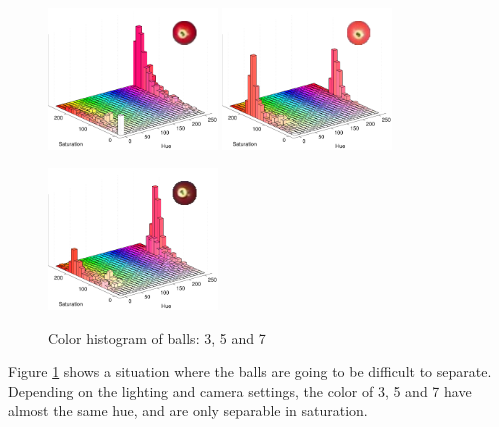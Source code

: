 \begin{figure}[H]
\centering
\subfloat
{
	\includegraphics[width=0.4\textwidth]{images/ballhist/3}
}
\subfloat
{
	\includegraphics[width=0.4\textwidth]{images/ballhist/5}
}

\subfloat
{
	\includegraphics[width=0.4\textwidth]{images/ballhist/7}
}

\caption{Color histogram of balls: 3, 5 and 7}
\label{fig:ballhist-3-7}
\end{figure} 
Figure \ref{fig:ballhist-3-7} shows a situation where the balls are going to be difficult to separate. Depending on the lighting and camera settings, the color of 3, 5 and 7 have almost the same hue, and are only separable in saturation.

